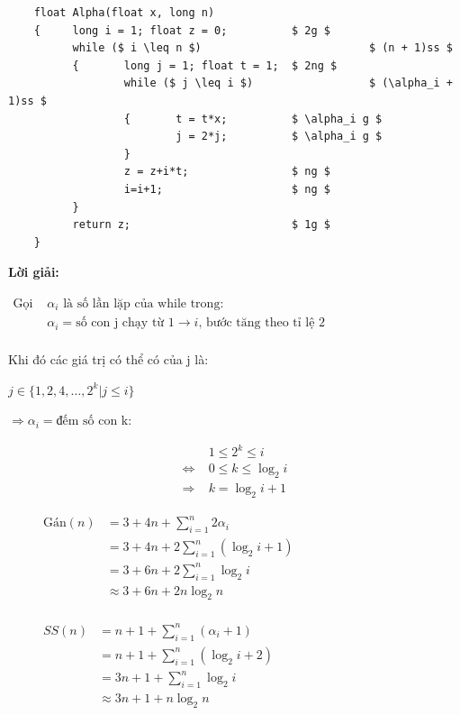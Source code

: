 \documentclass[12pt, letterpaper]{article}
\begin{document}
\begin{lstlisting}
    float Alpha(float x, long n)
    {     long i = 1; float z = 0;          $ 2g $
          while ($ i \leq n $)                          $ (n + 1)ss $
          {       long j = 1; float t = 1;  $ 2ng $
                  while ($ j \leq i $)                  $ (\alpha_i + 1)ss $
                  {       t = t*x;          $ \alpha_i g $
                          j = 2*j;          $ \alpha_i g $
                  }
                  z = z+i*t;                $ ng $
                  i=i+1;                    $ ng $
          }
          return z;                         $ 1g $
    }
\end{lstlisting}
\textbf{Lời giải:}
\vspace{\baselineskip}

$ \begin{aligned}
		\text{Gọi } & \alpha_i \text{ là số lần lặp của while trong:}                                    \\
		             & \alpha_i = \text{số con j chạy từ 1} \rightarrow i \text{, bước tăng theo tỉ lệ 2} \\
	\end{aligned} $

Khi đó các giá trị có thể có của j là:

\hspace{1cm} $ j \in \lbrace 1, 2, 4, \ldots, 2^k | j \leq i \rbrace $

$ \Rightarrow \alpha_i = \text{đếm số con k:} $

\begin{align*}
		                  & 1 \leq 2^k \leq i       \\
		\Leftrightarrow\; & 0 \leq k \leq \log_2{i} \\
		\Rightarrow\;     & k = \log_2{i} + 1
	\end{align*}

$\hspace{1cm} \begin{aligned}
		\text{Gán}(n) & = 3 + 4n + \sum^{n}_{i = 1} 2 \alpha_i        \\
		              & = 3 + 4n + 2 \sum^{n}_{i = 1} (\log_2{i} + 1) \\
		              & = 3 + 6n + 2 \sum^{n}_{i = 1} \log_2{i}       \\
		              & \approx 3 + 6n + 2n \log_2n                   \\
	\end{aligned} $

$\hspace{1cm} \begin{aligned}
		SS(n) & = n + 1 + \sum^{n}_{i = 1} (\alpha_i + 1)  \\
		      & = n + 1 + \sum^{n}_{i = 1} (\log_2{i} + 2) \\
		      & = 3n + 1 + \sum^{n}_{i = 1} \log_2{i}      \\
		      & \approx 3n + 1 + n \log_2n                 \\
	\end{aligned} $
\end{document}
